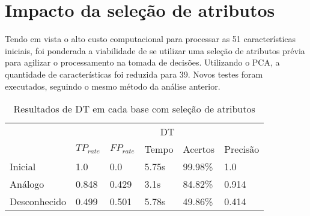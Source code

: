 


\section{Impacto da seleção de atributos}
Tendo em vista o alto custo computacional para processar as 51 características iniciais, foi ponderada a viabilidade
de se utilizar uma seleção de atributos prévia para agilizar o processamento na tomada de decisões. Utilizando o
PCA, a quantidade de características foi reduzida para 39. Novos testes foram executados, seguindo o mesmo método da
análise anterior.

\begin{table}[h]
    \centering
    \caption{Resultados de DT em cada base com seleção de atributos}
    \label{tab:dtattrless}
    \begin{tabular}{l|l|l|l|l|l|}
        \cline{2-6}
                                                                   & \multicolumn{5}{c|}{\cellcolor[HTML]{EFEFEF}DT}        \\ \cline{2-6}
                                                                   & $TP_{rate}$ & $FP_{rate}$ & Tempo & Acertos & Precisão \\ \hline
        \multicolumn{1}{|l|}{\cellcolor[HTML]{EFEFEF}Inicial}      & 1.0         & 0.0         & 5.75s & 99.98\% & 1.0      \\ \hline
        \multicolumn{1}{|l|}{\cellcolor[HTML]{EFEFEF}Análogo}      & 0.848       & 0.429       & 3.1s  & 84.82\% & 0.914    \\ \hline
        \multicolumn{1}{|l|}{\cellcolor[HTML]{EFEFEF}Desconhecido} & 0.499       & 0.501       & 5.78s & 49.86\% & 0.414    \\ \hline
    \end{tabular}
\end{table}


